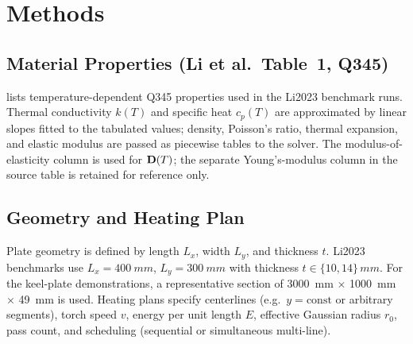   \section{Methods}
  \label{sec:methods}


  \subsection{Material Properties (Li et al.\ Table~1, Q345)}
   lists temperature-dependent Q345 properties used in the Li2023 benchmark runs. Thermal conductivity $k(T)$ and specific heat $c_p(T)$ are approximated by linear slopes fitted to the tabulated values; density, Poisson's ratio, thermal expansion, and elastic modulus are passed as piecewise tables to the solver. The modulus-of-elasticity column is used for $\mathbf{D}(T)$; the separate Young's-modulus column in the source table is retained for reference only.

  \begin{table}[H]
  \centering
  \caption{Q345 steel properties (Li et al.\ Table~1).}
  \label{tab:q345}
  \small
  \end{table}

  \subsection{Geometry and Heating Plan}
  Plate geometry is defined by length $L_x$, width $L_y$, and thickness $t$. Li2023 benchmarks use $L_x=\SI{400}{mm}$, $L_y=\SI{300}{mm}$ with thickness $t\in\{10,14\}\,\si{mm}$. For the keel-plate demonstrations, a representative section of \SI{3000}{mm} $\times$ \SI{1000}{mm} $\times$ \SI{49}{mm} is used. Heating plans specify centerlines (e.g.\ $y = \mathrm{const}$ or arbitrary segments), torch speed $v$, energy per unit length $E$, effective Gaussian radius $r_0$, pass count, and scheduling (sequential or simultaneous multi-line).

